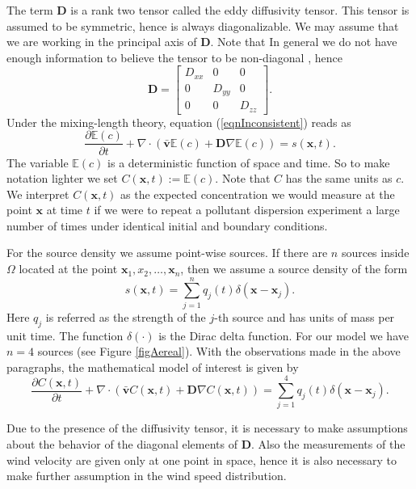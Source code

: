 \documentclass[12pt]{book}
\newcommand{\E}{\mathbb{E}} %
\newcommand{\x}{\textbf{x}}
\newcommand{\vv}{\textbf{v}}
\newcommand{\dv}{\nabla\cdot}
\begin{document}
The term $\textbf{D}$ is  a rank two tensor called the eddy diffusivity tensor. This tensor is assumed 
to be symmetric, hence is always diagonalizable. We may assume that we are working
in the principal axis of $\textbf{D}$. Note that  In general we do not have enough information to believe the tensor
to be non-diagonal \cite{seinfeld1998atmospheric}, hence 
\begin{equation*}
\textbf{D}=\begin{bmatrix}
D_{xx}& 0 & 0\\
0 & D_{yy} & 0\\
0 & 0 & D_{zz}
\end{bmatrix}.
\end{equation*}
Under the mixing-length theory, equation (\ref{eqnInconsistent}) reads as
\begin{equation*}
\frac{\partial\E(c)}{\partial t}+\dv(\bar{\vv}\E(c)+\textbf{D}\nabla\E(c))=s(\x,t).
\end{equation*}
The variable $\E(c)$ is a deterministic function of space and time. So to make
notation lighter  we set $C(\x,t):=\E(c)$. Note that $C$ has the same units
as $c$. We interpret $C(\x,t)$ as the expected concentration we would measure
 at the point $\x$ at time $t$ if we were to repeat a pollutant dispersion
experiment a large number of times under identical initial and boundary conditions.

For the source density we assume point-wise sources. If there are $n$ sources inside $\Omega$
located at the point $\x_{1},x_{2},\ldots,\x_{n}$,
then we assume a source density of the form
\begin{equation}\label{eqnSourceDensity}
s(\x,t)=\sum_{j=1}^{n}q_{j}(t)\delta(\x-\x_{j}).
\end{equation}
Here $q_{j}$ is referred as the  strength of the $j$-th source and has units of mass per unit time. 
The function $\delta(\cdot)$ is the Dirac delta function. For our model we have $n=4$ sources 
(see Figure \ref{figAereal}).
With the observations
made in the above  paragraphs, the mathematical model of interest
is given by 
\begin{equation}\label{eqnDifussivityFinalForm}
\frac{\partial C(\x,t)}{\partial t}+\dv(\bar{\vv}C(\x,t)+\textbf{D}\nabla C(\x,t))=\sum_{j=1}^{4}q_{j}(t)\delta(\x-\x_{j}).
\end{equation}



Due to the presence of the diffusivity tensor, it is necessary to make assumptions about
the behavior of the diagonal elements of $\textbf{D}$. Also the measurements of the wind velocity
are given only at one point in space, hence it is also necessary to make further assumption in 
the wind speed distribution. 
\end{document}
